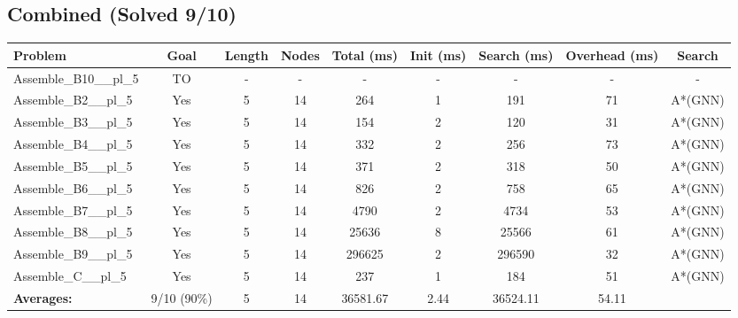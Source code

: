 \documentclass{article}
\begin{document}
\subsection*{Combined (Solved 9/10)}
\begin{tabular}{lcccccccc}
\toprule
Problem & Goal & Length & Nodes & Total (ms) & Init (ms) & Search (ms) & Overhead (ms) & Search \\
\midrule
Assemble\_B10\_\_pl\_5 & TO & - & - & - & - & - & - & - \\
Assemble\_B2\_\_pl\_5 & Yes & 5 & 14 & 264 & 1 & 191 & 71 & A*(GNN) \\
Assemble\_B3\_\_pl\_5 & Yes & 5 & 14 & 154 & 2 & 120 & 31 & A*(GNN) \\
Assemble\_B4\_\_pl\_5 & Yes & 5 & 14 & 332 & 2 & 256 & 73 & A*(GNN) \\
Assemble\_B5\_\_pl\_5 & Yes & 5 & 14 & 371 & 2 & 318 & 50 & A*(GNN) \\
Assemble\_B6\_\_pl\_5 & Yes & 5 & 14 & 826 & 2 & 758 & 65 & A*(GNN) \\
Assemble\_B7\_\_pl\_5 & Yes & 5 & 14 & 4790 & 2 & 4734 & 53 & A*(GNN) \\
Assemble\_B8\_\_pl\_5 & Yes & 5 & 14 & 25636 & 8 & 25566 & 61 & A*(GNN) \\
Assemble\_B9\_\_pl\_5 & Yes & 5 & 14 & 296625 & 2 & 296590 & 32 & A*(GNN) \\
Assemble\_C\_\_pl\_5 & Yes & 5 & 14 & 237 & 1 & 184 & 51 & A*(GNN) \\
\textbf{Averages:} & 9/10 (90\%) & 5 & 14 & 36581.67 & 2.44 & 36524.11 & 54.11 & \\
\bottomrule
\end{tabular}
\\[0.7cm]
\end{document}
